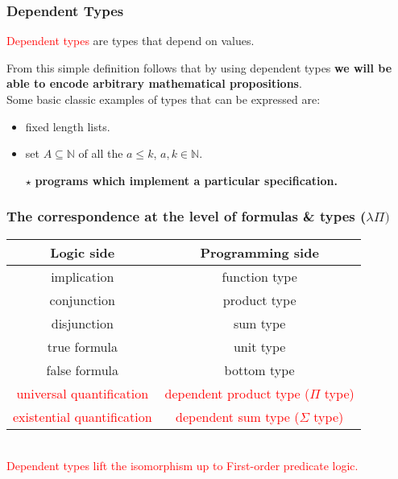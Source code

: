 
\begin{frame}
\frametitle{Dependent Types}
	\begin{definition}
		\textcolor{red}{Dependent types} are types that depend on values.
	\end{definition}
\medskip
From this simple definition follows that by using dependent types
\textbf{we will be able to encode arbitrary mathematical propositions}.
\\ \medskip
\pause
Some basic classic examples of types that can be expressed are:
\begin{itemize}
	\item fixed length lists.
	\item set $A \subseteq \mathbb{N}$ of all the $a \leq k$, $a,k \in \mathbb{N} $.
	\item [$\star$] \textbf{programs which implement a particular specification.}
\end{itemize}
\end{frame}


\begin{frame}
\frametitle{The correspondence at the level of formulas \& types ($\lambda \Pi)$}
\begin{tabular}{|c|c|}
	\hline 
	\textbf{Logic side} & \textbf{Programming side}\\
	\hline
	implication & function type \\
	\hline
	conjunction & product type \\
	\hline
	disjunction & sum type \\
	\hline
	true formula & unit type \\
	\hline
	false formula &	bottom type \\
	\hline
	\textcolor{red}{universal quantification} &	\textcolor{red}{dependent product type ($\Pi$ type)} \\
	\hline
	\textcolor{red}{existential quantification} & \textcolor{red}{dependent sum type ($\varSigma$ type)} \\
	\hline
\end{tabular}
\\ \medskip \medskip
\textcolor{red}{Dependent types lift the isomorphism up to First-order predicate logic.}
\end{frame}



